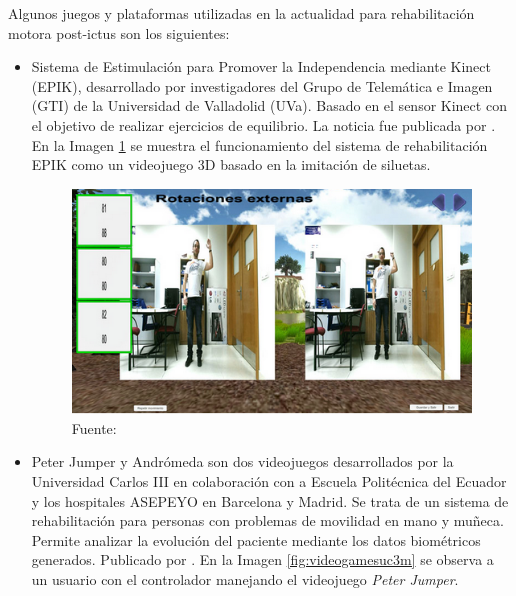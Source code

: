 Algunos juegos y plataformas utilizadas en la actualidad para rehabilitación motora post-ictus son los siguientes:
\begin{itemize}
	\item Sistema de Estimulación para Promover la Independencia mediante Kinect (EPIK), desarrollado por investigadores del Grupo de Telemática e Imagen (GTI) de la Universidad de Valladolid (UVa). Basado en el sensor Kinect con el objetivo de realizar ejercicios de equilibrio. La noticia fue publicada por \cite{cita7}. En la Imagen \ref{fig:epik} se muestra el funcionamiento del sistema de rehabilitación EPIK como un videojuego 3D basado en la imitación de siluetas.

	\begin{figure}[ht!]
		\centering
		\begin{minipage}{0.55\linewidth}
			\centering
			\includegraphics[width=\linewidth]{figs/EPIK.png}
		\end{minipage}
		\caption[Sistema de rehabilitación EPIK]{Fuente: \cite{cita7}}
		\label{fig:epik}
	\end{figure}

	\item Peter Jumper y Andrómeda son dos videojuegos desarrollados por la Universidad Carlos III en colaboración con a Escuela Politécnica del Ecuador y los hospitales ASEPEYO en Barcelona y Madrid. Se trata de un sistema de rehabilitación para personas con problemas de movilidad en mano y muñeca. Permite analizar la evolución del paciente mediante los datos biométricos generados. Publicado por \cite{cita8}. En la Imagen \ref{fig:videogamesuc3m} se observa a un usuario con el controlador manejando el videojuego \textit{Peter Jumper}.\\


\end{itemize}
